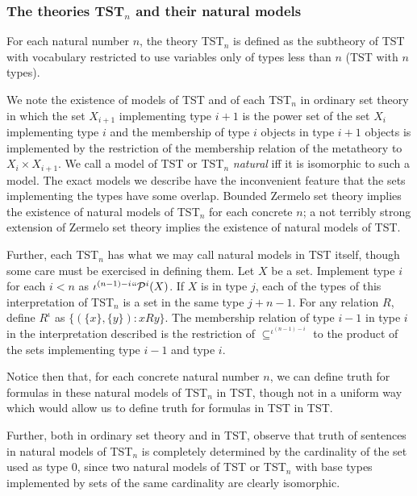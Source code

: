 \documentclass[112pt]{article}
\theoremstyle{definition}
\theoremstyle{remark}
\begin{document}
\subsubsection{The theories TST$_n$ and their natural models}

For each natural number $n$, the theory TST$_n$ is defined as the subtheory of TST with vocabulary restricted to use variables only of types less than $n$ (TST with $n$ types).

We note the existence of models of TST and of each TST$_n$ in ordinary set theory in which the set $X_{i+1}$ implementing
type $i+1$ is the power set of the set $X_i$ implementing type $i$ and the membership of type $i$ objects in type $i+1$ objects is implemented by the restriction of the membership relation of the metatheory to $X_i \times X_{i+1}$.  We call
a model of TST or TST$_n$ {\em natural\/} iff it is isomorphic to such a model.  The exact models we describe have the inconvenient feature that the sets implementing the types have some overlap.  Bounded Zermelo set theory implies the existence of natural models of TST$_n$ for each concrete $n$;  a not terribly strong extension of Zermelo set theory implies the existence of natural models of TST.

Further, each TST$_n$ has what we may call natural models in TST itself, though some care must be exercised in defining them.  Let $X$ be a set.  Implement type $i$ for each $i<n$ as
$\iota^{(n-1)-i}``{\cal P}^i(X)$.  If $X$ is in type $j$, each of the types of this interpretation of TST$_n$ is a set in the same type $j+n-1$.  For any relation $R$, define
$R^{\iota}$ as $\{(\{x\},\{y\}):x R y\}$.  The membership relation of type $i-1$ in type $i$ in the interpretation described is the restriction of $\subseteq^{\iota^{(n-1)-i}}$ to
the product of the sets implementing type $i-1$ and type $i$.\label{tstnmodel}

Notice then that, for each concrete natural number $n$, we can define truth for formulas in these natural models of TST$_n$  in TST, though not in a uniform way which would allow us to define truth for formulas
in TST in TST.

Further, both in ordinary set theory and in TST, observe that truth of sentences in natural models of TST$_n$ is completely determined by the cardinality of the set used as type 0, since two natural models of TST or TST$_n$ with base types implemented by sets of the same cardinality are clearly isomorphic.

\newpage
\end{document}
